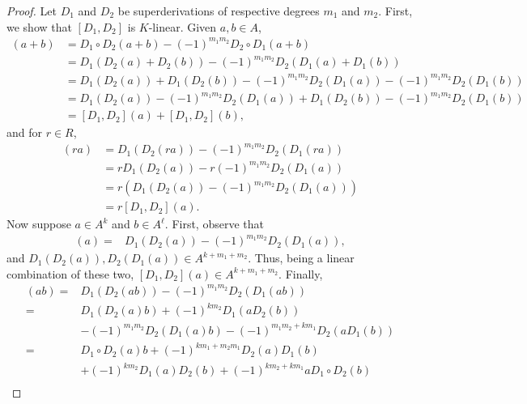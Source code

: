 \documentclass[12pt]{article}
\theoremstyle{definition}
\begin{document}
\begin{proof}
	Let $D_1$ and $D_2$ be superderivations of respective degrees $m_1$ and $m_2$.
	First, we show that $[D_1, D_2]$ is $K$-linear.
	Given $a, b \in A$, \begin{align*}
		[D_1, D_2](a + b) & = D_1 \circ D_2 (a + b) - (-1)^{m_1m_2}D_2 \circ D_1(a + b)                       \\
		                  & = D_1 (D_2(a) + D_2(b)) - (-1)^{m_1m_2}D_2(D_1(a) + D_1(b))                       \\
		                  & = D_1(D_2(a)) + D_1(D_2(b)) - (-1)^{m_1m_2}D_2(D_1(a)) - (-1)^{m_1m_2}D_2(D_1(b)) \\
		                  & = D_1(D_2(a)) - (-1)^{m_1m_2}D_2(D_1(a)) + D_1(D_2(b)) - (-1)^{m_1m_2}D_2(D_1(b)) \\
		                  & = [D_1, D_2](a) + [D_1, D_2](b),
	\end{align*}
	and for $r \in R$, \begin{align*}
		[D_1, D_2](ra) & = D_1(D_2(ra)) - (-1)^{m_1m_2}D_2(D_1(ra))  \\
		               & = rD_1(D_2(a)) - r(-1)^{m_1m_2}D_2(D_1(a))  \\
		               & = r(D_1(D_2(a)) - (-1)^{m_1m_2}D_2(D_1(a))) \\
		               & = r[D_1, D_2](a).
	\end{align*}
	Now suppose $a \in A^k$ and $b \in A^\ell$.
	First, observe that \begin{align*}
		[D_1, D_2](a) = {} & D_1(D_2(a)) - (-1)^{m_1m_2}D_2(D_1(a)),
	\end{align*}
	and $D_1(D_2(a)), D_2(D_1(a)) \in A^{k + m_1 + m_2}$. Thus, being a linear combination of these two, $[D_1, D_2](a) \in A^{k + m_1 + m_2}$.
	Finally, \begin{align*}
		[D_1, D_2](ab) = {} & D_1(D_2(ab)) - (-1)^{m_1m_2}D_2(D_1(ab))                                                         \\
		= {}                & D_1(D_2(a)b) + (-1)^{km_2}D_1(aD_2(b))                                                           \\
		                    & - (-1)^{m_1m_2}D_2(D_1(a)b) - (-1)^{m_1m_2 + km_1}D_2(aD_1(b))                                   \\
		= {}                & D_1 \circ D_2(a)b + (-1)^{km_1 + m_2m_1}D_2(a)D_1(b)                                             \\
		                    & + (-1)^{km_2}D_1(a)D_2(b) + (-1)^{km_2 + km_1}aD_1 \circ D_2(b)                                  \\

\end{align*}
\end{proof}
\end{document}
